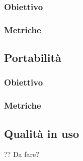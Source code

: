\subsubsection{Obiettivo}
\subsubsection{Metriche}
\subsection{Portabilità}
\subsubsection{Obiettivo}
\subsubsection{Metriche}
\subsection{Qualità in uso} ?? Da fare?


